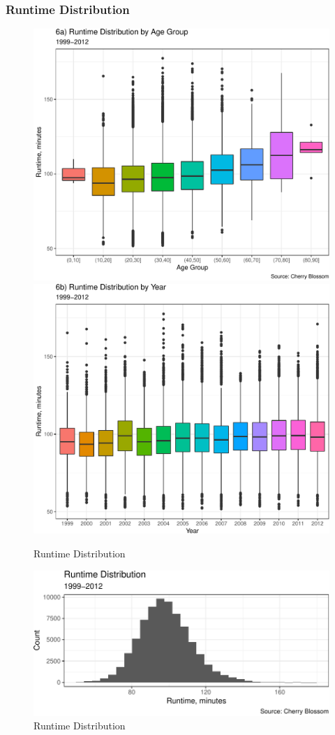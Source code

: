 \documentclass[
]{article}
\begin{document}
\hypertarget{runtime-distribution}{%
\subsubsection{Runtime Distribution}\label{runtime-distribution}}

\begin{figure}[H]

\includegraphics[width=.49\linewidth,]{case_study02_files/figure-latex/unnamed-chunk-14-1} \includegraphics[width=.49\linewidth,]{case_study02_files/figure-latex/unnamed-chunk-14-2} \hfill{}

\caption{Runtime Distribution}\label{fig:unnamed-chunk-14}
\end{figure}

\begin{figure}[H]

{\centering \includegraphics{case_study02_files/figure-latex/unnamed-chunk-15-1} 

}

\caption{Runtime Distribution}\label{fig:unnamed-chunk-15}
\end{figure}
\end{document}
